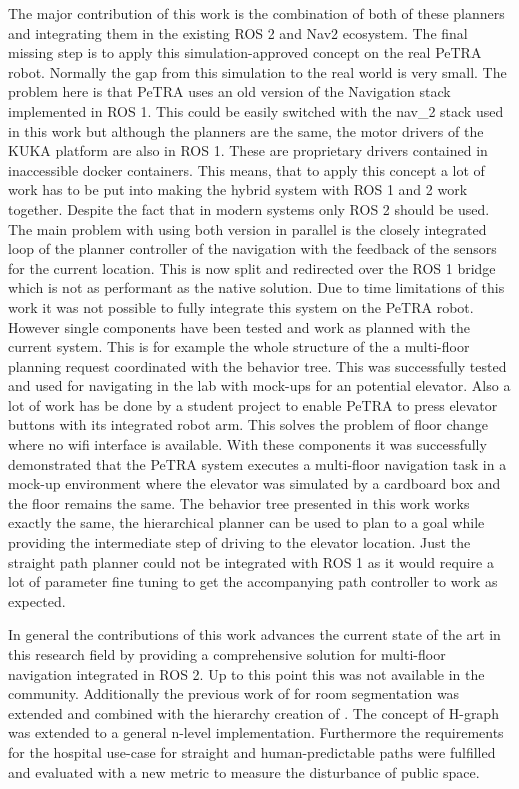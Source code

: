 The major contribution of this work is the combination of both of these planners and integrating them in the existing ROS 2 and Nav2 ecosystem. The final missing step is to apply this simulation-approved concept on the real PeTRA robot. Normally the gap from this simulation to the real world is very small. The problem here is that PeTRA uses an old version of the Navigation stack implemented in ROS 1. This could be easily switched with the \gls{nav_2} stack used in this work but although the planners are the same, the motor drivers of the KUKA platform are also in ROS 1. These are proprietary drivers contained in inaccessible docker containers. This means, that to apply this concept a lot of work has to be put into making the hybrid system with ROS 1 and 2 work together. Despite the fact that in modern systems only ROS 2 should be used. The main problem with using both version in parallel is the closely integrated loop of the planner controller of the navigation with the feedback of the sensors for the current location. This is now split and redirected over the ROS 1 bridge which is not as performant as the native solution. Due to time limitations of this work it was not possible to fully integrate this system on the PeTRA robot. However single components have been tested and work as planned with the current system. This is for example the whole structure of the a multi-floor planning request coordinated with the behavior tree. This was successfully tested and used for navigating in the lab with mock-ups for an potential elevator. Also a lot of work has be done by a student project to enable PeTRA to press elevator buttons with its integrated robot arm. This solves the problem of floor change where no wifi interface is available. With these components it was successfully demonstrated that the PeTRA system executes a multi-floor navigation task in a mock-up environment where the elevator was simulated by a cardboard box and the floor remains the same. The behavior tree presented in this work works exactly the same, the hierarchical planner can be used to plan to a goal while providing the intermediate step of driving to the elevator location. Just the straight path planner could not be integrated with ROS 1 as it would require a lot of parameter fine tuning to get the accompanying path controller to work as expected.

In general the contributions of this work advances the current state of the art in this research field by providing a comprehensive solution for multi-floor navigation integrated in ROS 2. Up to this point this was not available in the community. Additionally the previous work of \cite{ryu_hierarchical_2020} for room segmentation was extended and combined with the hierarchy creation of \cite{gregoric_autonomous_2022}. The concept of H-graph was extended to a general n-level implementation. Furthermore the requirements for the hospital use-case for straight and human-predictable paths were fulfilled and evaluated with a new metric to measure the disturbance of public space. 